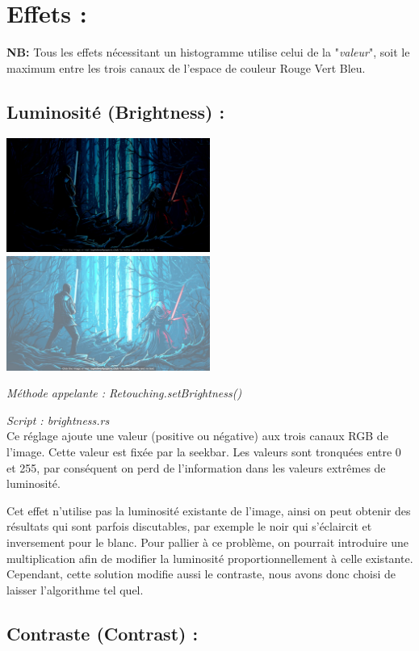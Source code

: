 \section{Effets :}
\textbf{NB:} Tous les effets nécessitant un histogramme utilise celui de la "\emph{valeur}", soit le maximum entre les trois canaux de l'espace de couleur Rouge Vert Bleu.

\subsection{Luminosité (Brightness) :}
\includegraphics[width=0.5\textwidth]{report_src/brightness_low.jpeg}
\includegraphics[width=0.5\textwidth]{report_src/brightness_high.jpeg}

\emph{Méthode appelante : Retouching.setBrightness()}

\emph{Script : brightness.rs}
\\

Ce réglage ajoute une valeur (positive ou négative) aux trois canaux RGB de l'image. Cette valeur est fixée par la seekbar.
Les valeurs sont tronquées entre 0 et 255, par conséquent on perd de l'information dans les valeurs extrêmes de luminosité.

Cet effet n'utilise pas la luminosité existante de l'image, ainsi on peut obtenir des résultats qui sont parfois discutables, par exemple
le noir qui s'éclaircit et inversement pour le blanc. Pour pallier à ce problème, on pourrait introduire une multiplication afin de modifier
la luminosité proportionnellement à celle existante. Cependant, cette solution modifie aussi le contraste, nous avons donc choisi
de laisser l'algorithme tel quel.


\subsection{Contraste (Contrast) :}

